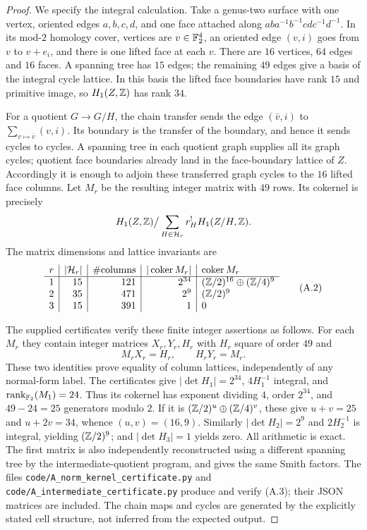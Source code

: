 \begin{proof}
We specify the integral calculation. Take a genus-two surface with
one vertex, oriented edges $a,b,c,d$, and one face attached along
$aba^{-1}b^{-1}cdc^{-1}d^{-1}$. In its mod-$2$ homology cover,
vertices are $v\in\mathbb F_2^4$, an oriented edge $(v,i)$ goes from
$v$ to $v+e_i$, and there is one lifted face at each $v$. There
are $16$ vertices, $64$ edges and $16$ faces. A spanning tree has
$15$ edges; the remaining $49$ edges give a basis of the integral
cycle lattice. In this basis the lifted face boundaries have rank
$15$ and primitive image, so $H_1(Z,\mathbb Z)$ has rank $34$.

For a quotient $G\to G/H$, the chain transfer sends the edge
$(\bar v,i)$ to $\sum_{v\mapsto\bar v}(v,i)$.
Its boundary is the transfer of the boundary, and hence it sends
cycles to cycles. A spanning tree in each quotient graph supplies
all its graph cycles; quotient face boundaries already land in the
face-boundary lattice of $Z$. Accordingly it is enough to adjoin
these transferred graph cycles to the $16$ lifted face columns.
Let $M_r$ be the resulting integer matrix with $49$ rows. Its
cokernel is precisely
\[
 H_1(Z,\mathbb Z)\big/\sum_{H\in\mathcal H_r}r_H^!H_1(Z/H,\mathbb Z).
\]
The matrix dimensions and lattice invariants are
\[
\begin{array}{c|r|r|r|l}
 r&|\mathcal H_r|&\#\text{columns}&|\operatorname{coker}M_r|
     &\operatorname{coker}M_r\\\hline
 1&15&121&2^{34}&(\mathbb Z/2)^{16}\oplus(\mathbb Z/4)^9\\
 2&35&471&2^9&(\mathbb Z/2)^9\\
 3&15&391&1&0
\end{array}                                                        \tag{A.2}
\]

The supplied certificates verify these finite integer assertions as
follows. For each $M_r$ they contain integer matrices $X_r,Y_r,H_r$
with $H_r$ square of order $49$ and
\[
 M_rX_r=H_r,\qquad H_rY_r=M_r.                                     \tag{A.3}
\]
These two identities prove equality of column lattices, independently
of any normal-form label. The certificates give
$|\det H_1|=2^{34}$, $4H_1^{-1}$ integral, and
$\operatorname{rank}_{\mathbb F_2}(M_1)=24$.
Thus its cokernel has exponent dividing $4$, order $2^{34}$, and
$49-24=25$ generators modulo $2$. If it is
$(\mathbb Z/2)^u\oplus(\mathbb Z/4)^v$, these give $u+v=25$ and $u+2v=34$,
whence $(u,v)=(16,9)$. Similarly
$|\det H_2|=2^9$ and $2H_2^{-1}$ is integral, yielding
$(\mathbb Z/2)^9$; and $|\det H_3|=1$ yields zero. All arithmetic is
exact. The first matrix is also independently reconstructed using
a different spanning tree by the intermediate-quotient program,
and gives the same Smith factors. The files
\texttt{code/A\_norm\_kernel\_certificate.py} and
\texttt{code/A\_intermediate\_certificate.py} produce and verify
(A.3); their JSON matrices are included. The chain maps and cycles
are generated by the explicitly stated cell structure, not
inferred from the expected output.


\end{proof}
